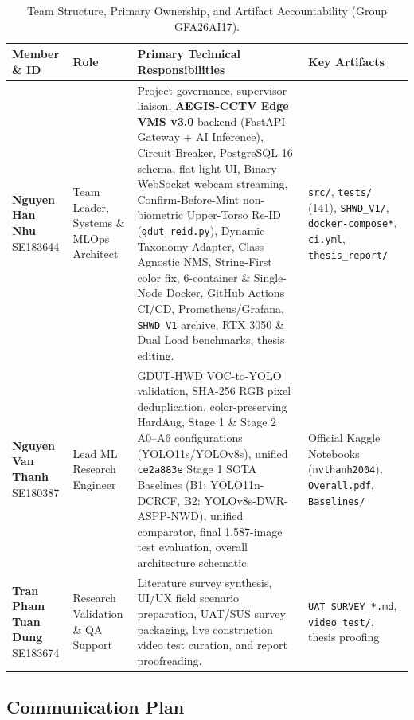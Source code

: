 \begin{table}[H]
\centering
\caption{Team Structure, Primary Ownership, and Artifact Accountability (Group GFA26AI17).}
\label{tab:ch2_team_roles}
\footnotesize
\renewcommand{\arraystretch}{1.08}
\begin{tabularx}{\textwidth}{|>{\raggedright\arraybackslash}p{2.9cm}|>{\raggedright\arraybackslash}p{2.2cm}|>{\raggedright\arraybackslash}X|>{\raggedright\arraybackslash}p{2.8cm}|}
\hline
\rowcolor{slatehdr}
\textbf{Member \& ID} & \textbf{Role} & \textbf{Primary Technical Responsibilities} & \textbf{Key Artifacts} \\
\hline
\textbf{Nguyen Han Nhu} \newline SE183644 & Team Leader, Systems \& MLOps Architect & Project governance, supervisor liaison, \textbf{AEGIS-CCTV Edge VMS v3.0} backend (FastAPI Gateway + AI Inference), Circuit Breaker, PostgreSQL 16 schema, flat light UI, Binary WebSocket webcam streaming, Confirm-Before-Mint non-biometric Upper-Torso Re-ID (\texttt{gdut\_reid.py}), Dynamic Taxonomy Adapter, Class-Agnostic NMS, String-First color fix, 6-container \& Single-Node Docker, GitHub Actions CI/CD, Prometheus/Grafana, \texttt{SHWD\_V1} archive, RTX 3050 \& Dual Load benchmarks, thesis editing. & \texttt{src/}, \texttt{tests/} (141), \texttt{SHWD\_V1/}, \texttt{docker-compose*}, \texttt{ci.yml}, \texttt{thesis\_report/} \\
\hline
\textbf{Nguyen Van Thanh} \newline SE180387 & Lead ML Research Engineer & GDUT-HWD VOC-to-YOLO validation, SHA-256 RGB pixel deduplication, color-preserving HardAug, Stage 1 \& Stage 2 A0--A6 configurations (YOLO11s/YOLOv8s), unified \texttt{ce2a883e} Stage 1 SOTA Baselines (B1: YOLO11n-DCRCF, B2: YOLOv8s-DWR-ASPP-NWD), unified comparator, final 1,587-image test evaluation, overall architecture schematic. & 15 Official Kaggle Notebooks (\texttt{nvthanh2004}), \texttt{Overall.pdf}, \texttt{Baselines/} \\
\hline
\textbf{Tran Pham Tuan Dung} \newline SE183674 & Research Validation \& QA Support & Literature survey synthesis, UI/UX field scenario preparation, UAT/SUS survey packaging, live construction video test curation, and report proofreading. & \texttt{UAT\_SURVEY\_*.md}, \texttt{video\_test/}, thesis proofing \\
\hline
\end{tabularx}
\end{table}

\subsection{Communication Plan}

